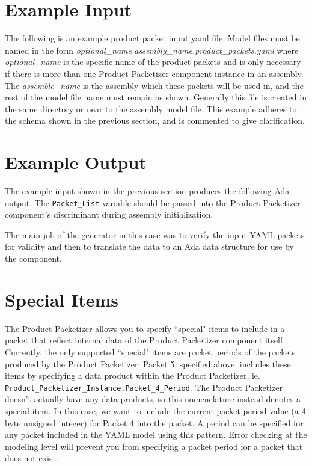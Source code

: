 
\section{Example Input}

The following is an example product packet input yaml file. Model files must be named in the form \textit{optional\_name.assembly\_name.product\_packets.yaml} where \textit{optional\_name} is the specific name of the product packets and is only necessary if there is more than one Product Packetizer component instance in an assembly. The \textit{assemble\_name} is the assembly which these packets will be used in, and the rest of the model file name must remain as shown. Generally this file is created in the same directory or near to the assembly model file. This example adheres to the schema shown in the previous section, and is commented to give clarification.


\section{Example Output}

The example input shown in the previous section produces the following Ada output. The \texttt{Packet\_List} variable should be passed into the Product Packetizer component's discriminant during assembly initialization.

The main job of the generator in this case was to verify the input YAML packets for validity and then to translate the data to an Ada data structure for use by the component.


\section{Special Items}

The Product Packetizer allows you to specify ``special" items to include in a packet that reflect internal data of the Product Packetizer component itself. Currently, the only supported ``special" items are packet periods of the packets produced by the Product Packetizer. Packet 5, specified above, includes these items by specifying a data product within the Product Packetizer, ie. \texttt{Product\_Packetizer\_Instance.Packet\_4\_Period}. The Product Packetizer doesn't actually have any data products, so this nomenclature instead denotes a special item. In this case, we want to include the current packet period value (a 4 byte unsigned integer) for Packet 4 into the packet. A period can be specified for any packet included in the YAML model using this pattern. Error checking at the modeling level will prevent you from specifying a packet period for a packet that does not exist.


